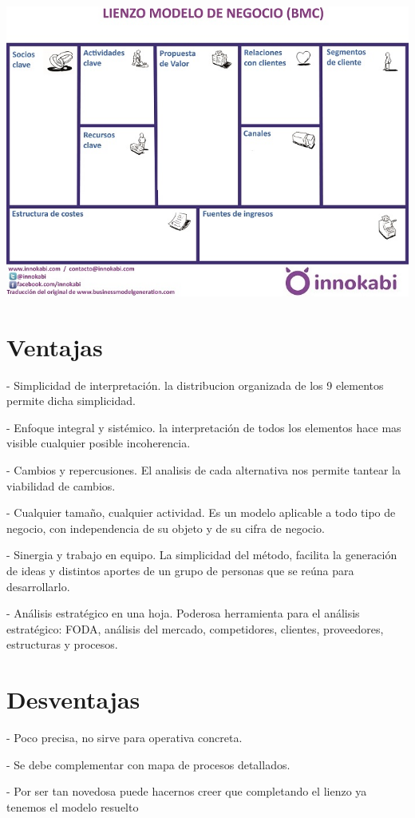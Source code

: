 \begin{center}
\includegraphics[width=15cm]{./Imagenes/img6}
\end{center}


\section{Ventajas}
\item - Simplicidad de interpretación. la distribucion organizada de los  9 elementos permite dicha simplicidad.
\item - Enfoque integral y sistémico. la interpretación de todos los elementos hace mas visible cualquier posible incoherencia.
\item - Cambios y repercusiones. El analisis de cada alternativa nos permite tantear la viabilidad de cambios.
\item - Cualquier tamaño, cualquier actividad. Es un modelo aplicable a todo tipo de negocio, con independencia de su objeto y de su cifra de negocio.
\item - Sinergia y trabajo en equipo. La simplicidad del método, facilita la generación de ideas y distintos aportes de un grupo de personas que se reúna para desarrollarlo. 
\item - Análisis estratégico en una hoja. Poderosa herramienta para el análisis estratégico: FODA, análisis del mercado, competidores, clientes, proveedores, estructuras y procesos.

\section{Desventajas}
\item - Poco precisa, no sirve para operativa concreta.
\item - Se debe complementar con mapa de procesos detallados.
\item - Por ser tan novedosa puede hacernos creer que completando el lienzo ya tenemos el modelo resuelto


